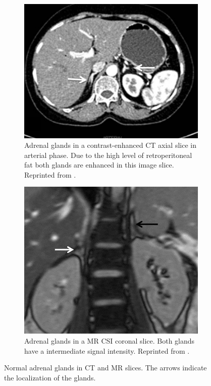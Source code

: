 \documentclass{article}
\begin{document}
\begin{figure}
    \centering
    \begin{subfigure}[b]{0.45\textwidth}
        \centering
        \includegraphics[width=\textwidth]{figures/CT_adrenal_enhanced.png}
        \caption{Adrenal glands in a contrast-enhanced CT axial slice in arterial phase. Due to the high level of retroperitoneal fat both glands are enhanced in this image slice. Reprinted from \cite{Panda2015}.}
        \label{fig:adrenal_ct}
    \end{subfigure}
    \hfill
    \begin{subfigure}[b]{0.45\textwidth}
        \centering
        \includegraphics[width=\textwidth]{figures/MRI_adrenal.png}
        \caption{Adrenal glands in a MR CSI coronal slice. Both glands have a intermediate signal intensity. Reprinted from \cite{Panda2015}. }
        \label{fig:adrenal_mri}
    \end{subfigure}
    \caption{Normal adrenal glands in CT and MR slices. The arrows indicate the localization of the glands.}
    \label{fig:adrenal_glands_normal}
\end{figure}
\end{document}

